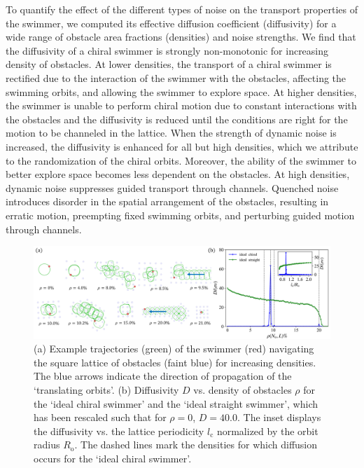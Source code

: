\documentclass[aps,pre,twocolumn,showpacs,superscriptaddress,amsmath,amssymb,longbibliography]{revtex4-2}
\begin{document}
To quantify the effect of the different types of noise on the transport properties of the swimmer, we computed its effective diffusion coefficient (diffusivity) for a wide range of obstacle area fractions (densities) and noise strengths. We find that the diffusivity of a chiral swimmer is strongly non-monotonic for increasing density of obstacles. At lower densities, the transport of a chiral swimmer is rectified due to the interaction of the swimmer with the obstacles, affecting the swimming orbits, and allowing the swimmer to explore space. At higher densities, the swimmer is unable to perform chiral motion due to constant interactions with the obstacles and the diffusivity is reduced until the conditions are right for the motion to be channeled in the lattice. When the strength of dynamic noise is increased, the diffusivity is enhanced for all but high densities, which we attribute to the randomization of the chiral orbits. Moreover, the ability of the swimmer to better explore space becomes less dependent on the obstacles. At high densities, dynamic noise suppresses guided transport through channels. Quenched noise introduces disorder in the spatial arrangement of the obstacles, resulting in erratic motion, preempting fixed swimming orbits, and perturbing guided motion through channels.
\begin{figure}[ht!]
     \centering
     \includegraphics[width=18.7 cm]{fig_2.png}
        \caption{(a) Example trajectories (green) of the swimmer (red) navigating the square lattice of obstacles (faint blue) for increasing densities. The blue arrows indicate the direction of propagation of the `translating orbits'. (b) Diffusivity $D$ vs. density of obstacles $\rho$ for the `ideal chiral swimmer' and the `ideal straight swimmer', which has been rescaled such that for $\rho=0$, $D=40.0$. The inset displays the diffusivity vs. the lattice periodicity $l_{\textrm{c}}$ normalized by the orbit radius $R_{\textrm{o}}$. The dashed lines mark the densities for which diffusion occurs for the `ideal chiral swimmer'.}
        \label{fig_ideal}
\end{figure}
\end{document}
